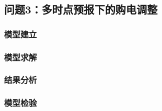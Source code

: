 \subsection{问题3：多时点预报下的购电调整}
\subsubsection{模型建立}

\subsubsection{模型求解}

\subsubsection{结果分析}

\subsubsection{模型检验}

